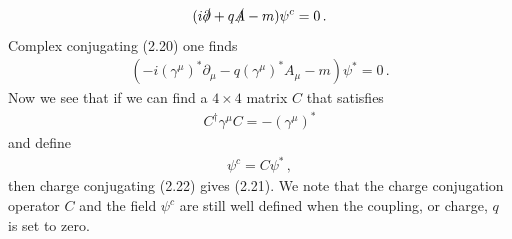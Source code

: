 \documentclass[11pt, oneside]{book}
\theoremstyle{break}
\theoremstyle{break}
\newcommand{\pd}{\partial}
\begin{document}
\begin{align}
(i\slashed{\pd} + q\slashed{A} - m) \psi^c= 0\,.
\end{align}
Complex conjugating (2.20) one finds
\begin{align}
\left(-i(\gamma^\mu)^*\pd_\mu - q(\gamma^\mu)^*A_\mu - m\right)\psi^* = 0\,.
\end{align}
Now we see that if we can find a $4\times 4$ matrix $C$ that satisfies
\begin{align}
C^{\dagger} \gamma^\mu C = -(\gamma^\mu)^*
\end{align}
and define
\begin{align}
\psi^c = C \psi^*\,,
\end{align}
then charge conjugating (2.22) gives (2.21). We note that the charge conjugation operator $C$ and the field $\psi^c$ are still well defined when the coupling, or charge, $q$ is set to zero.\\
\end{document}
